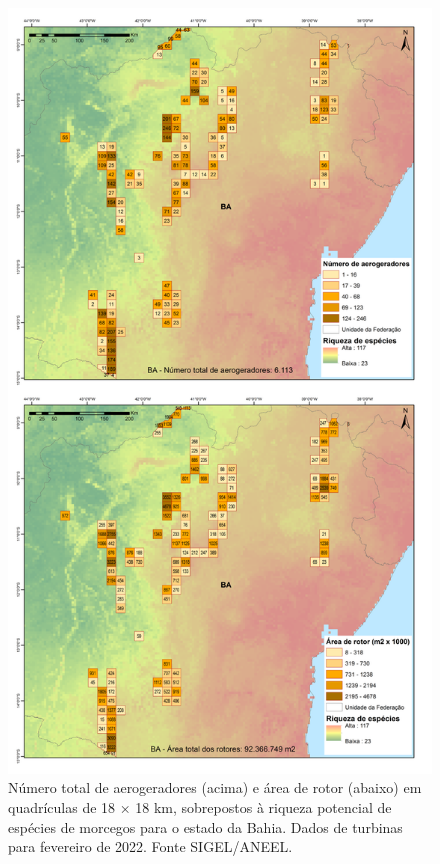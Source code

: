 \documentclass[
  oneside]{scrbook}
\begin{document}
\begin{figure}[H]

{\centering \includegraphics[width=0.75\linewidth]{imagens/cap09/Figura_9.12} 

}

\caption{Número total de aerogeradores (acima) e área de rotor (abaixo) em quadrículas de 18 × 18 km, sobrepostos à riqueza potencial de espécies de morcegos para o estado da Bahia. Dados de turbinas para fevereiro de 2022. Fonte SIGEL/ANEEL.}\label{fig:77}
\end{figure}
\end{document}
